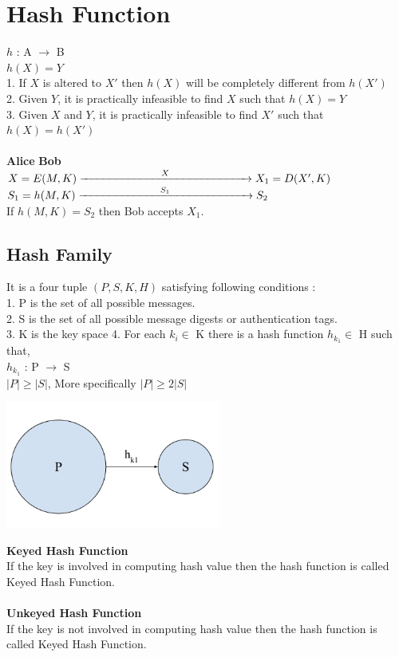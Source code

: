 \documentclass[11pt]{article}
\begin{document}
\section*{Hash Function}
$h$ : A $\rightarrow$ B \\
$h(X) = Y$ \\
1. If $X$ is altered to $X'$ then $h(X)$ will be completely different from $h(X')$ \\
2. Given $Y$, it is practically infeasible to find $X$ such that $h(X) = Y$\\
3. Given $X$ and $Y$, it is practically infeasible to find $X'$ such that $h(X) = h(X')$\\
\\
\textbf{Alice} \hspace{6.5cm} \textbf{Bob} \\
$X = E(M,K)\xrightarrow{\hspace*{2.5cm}X\hspace*{2.5cm}} X_{1} = D(X',K)$ \\
$S_{1} = h(M,K)\xrightarrow{\hspace*{2.5cm}S_{1}\hspace*{2.5cm}} S_{2}$ \\
If $ h(M,K) = S_{2}$ then Bob accepts $X_{1}$. 
\subsection*{Hash Family}
It is a four tuple $(P,S,K,H)$ satisfying following conditions : \\
1. P is the set of all possible messages. \\
2. S is the set of all possible message digests or authentication tags. \\
3. K is the key space
4. For each $k_{i} \in$ K there is a hash function $h_{k_{1}} \in$ H such that,\\
$h_{k_{1}}$ : P $\rightarrow$ S \\
$|P| \geq |S|$, More specifically $|P| \geq 2|S| $ 
\begin{center}
\includegraphics[width=200pt]{p3.png}
\end{center}
\textbf{Keyed Hash Function}\\
If the key is involved in computing hash value then the hash function is called Keyed Hash Function. \\\\
\textbf{Unkeyed Hash Function}\\
If the key is not involved in computing hash value then the hash function is called Keyed Hash Function.
\end{document}
